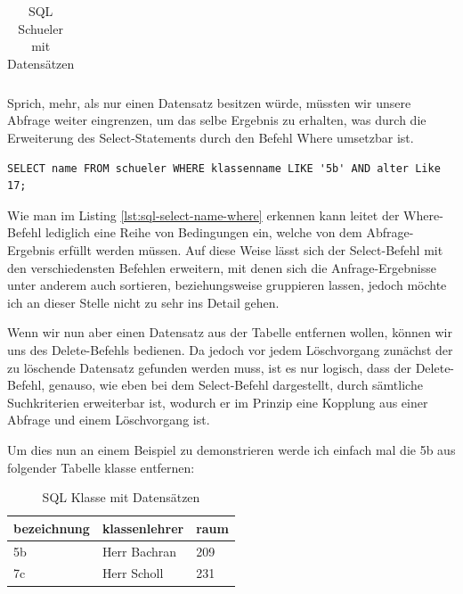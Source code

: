 \documentclass[12pt,a4paper,bibliography=totocnumbered,listof=totocnumbered]{scrartcl}
\begin{document}
\begin{minipage}{\linewidth}
\begin{table}[!h]
\begin{tabular}{|l|l|l|}
	\end{tabular}
	\caption{SQL Schueler mit Datensätzen}
	\label{tab:sql-schueler3}
\end{table}

Sprich, mehr, als nur einen Datensatz besitzen würde, müssten wir unsere Abfrage weiter eingrenzen, um das selbe Ergebnis zu erhalten, was durch die Erweiterung des \glqq Select-Statements\grqq{} durch den Befehl \glqq Where\grqq{} umsetzbar ist.


\vspace{1em}
\begin{lstlisting}[caption= SQL Select Name + Where, label=lst:sql-select-name-where]
SELECT name FROM schueler WHERE klassenname LIKE '5b' AND alter Like 17;
\end{lstlisting}

Wie man im Listing \ref{lst:sql-select-name-where} erkennen kann leitet der \glqq Where-Befehl\grqq{} lediglich eine Reihe von Bedingungen ein, welche von dem Abfrage-Ergebnis erfüllt werden müssen.
Auf diese Weise lässt sich der \glqq Select-Befehl\grqq{} mit den verschiedensten Befehlen erweitern, mit denen sich die Anfrage-Ergebnisse unter anderem auch sortieren, beziehungsweise gruppieren lassen, jedoch möchte ich an dieser Stelle nicht zu sehr ins Detail gehen.

Wenn wir nun aber einen Datensatz aus der Tabelle entfernen wollen, können wir uns des  \glqq Delete-Befehls\grqq{} bedienen.
Da jedoch vor jedem Löschvorgang zunächst der zu löschende Datensatz gefunden werden muss, ist es nur logisch, dass der  \glqq Delete-Befehl\grqq{}, genauso, wie eben bei dem  \glqq Select-Befehl\grqq{} dargestellt, durch sämtliche Suchkriterien erweiterbar ist, wodurch er im Prinzip eine Kopplung aus einer Abfrage und einem Löschvorgang ist.

Um dies nun an einem Beispiel zu demonstrieren werde ich einfach mal die \glqq 5b\grqq{} aus folgender Tabelle \glqq klasse\grqq{} entfernen:\\
\vspace{1em}
\begin{table}[!h]
	\centering
	\begin{tabular}{|l|l|l|}
		\hline
		\textbf{bezeichnung} & \textbf{klassenlehrer} & \textbf{raum}\\
		\hline
		5b & Herr Bachran & 209\\
		\hline
		7c & Herr Scholl & 231\\
		
	\end{tabular}
	\caption{SQL Klasse mit Datensätzen}
	\label{tab:sql-klasse2}
\end{table}


\end{minipage}
\end{document}
